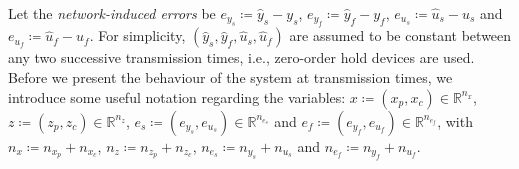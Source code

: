 Let the \emph{network-induced errors} be $e_{y_s} \coloneqq \hat{y}_s - y_s$, $e_{y_f} \coloneqq \hat{y}_f - y_f$, $  e_{u_s} \coloneqq \hat{u}_s - u_s$ and $  e_{u_f} \coloneqq \hat{u}_f - u_f $.
For simplicity, $(\hat{y}_s,\hat{y}_f,\hat{u}_s,\hat{u}_f)$ are assumed to be constant between any two successive transmission times, i.e., zero-order hold devices are used.
Before we present the behaviour of the system at transmission times, we introduce some useful notation regarding the variables: $x\coloneqq (x_p,x_c)\in\mathbb{R}^{n_x}$, $z \coloneqq ( z_p, z_c) \in \mathbb{R}^{n_z}$, $e_s \coloneqq ( e_{y_s} , e_{u_s})\in \mathbb{R}^{n_{e_s}}$ and $e_f \coloneqq (e_{y_f} , e_{u_f}) \in \mathbb{R}^{n_{e_f}}$, with $n_x\coloneqq n_{x_p}+n_{x_c}$,  $n_z\coloneqq n_{z_p}+n_{z_c}$, $n_{e_s}\coloneqq n_{y_s}+n_{u_s}$ and  $n_{e_f}\coloneqq n_{y_f}+n_{u_f}$. 
 
